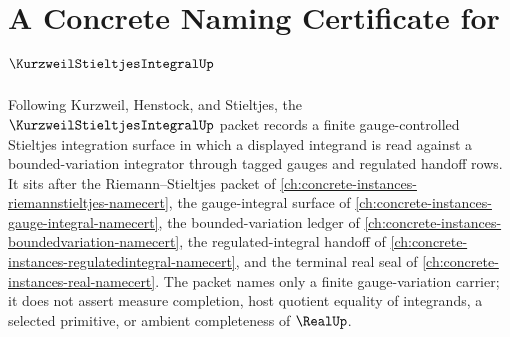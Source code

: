 \chapter{A Concrete Naming Certificate for $\KurzweilStieltjesIntegralUp$}
\label{ch:concrete-instances-kurzweil-stieltjes-integral-namecert}

Following Kurzweil, Henstock, and Stieltjes, the $\KurzweilStieltjesIntegralUp$ packet records a finite gauge-controlled Stieltjes integration surface in which a displayed integrand is read against a bounded-variation integrator through tagged gauges and regulated handoff rows. It sits after the Riemann--Stieltjes packet of \autoref{ch:concrete-instances-riemannstieltjes-namecert}, the gauge-integral surface of \autoref{ch:concrete-instances-gauge-integral-namecert}, the bounded-variation ledger of \autoref{ch:concrete-instances-boundedvariation-namecert}, the regulated-integral handoff of \autoref{ch:concrete-instances-regulatedintegral-namecert}, and the terminal real seal of \autoref{ch:concrete-instances-real-namecert}. The packet names only a finite gauge-variation carrier; it does not assert measure completion, host quotient equality of integrands, a selected primitive, or ambient completeness of $\RealUp$.

